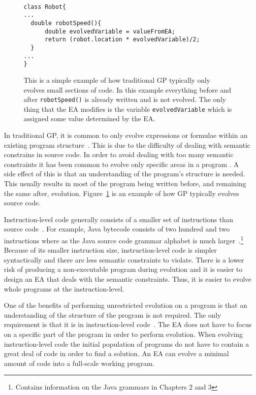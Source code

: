 \documentclass{sig-alternate}
\begin{document}
\begin{figure}
\centering
{\tt
\begin{verbatim}
class Robot{	
...
  double robotSpeed(){	
      double evolvedVariable = valueFromEA;
      return (robot.location * evolvedVariable)/2;
  }
...
}

\end{verbatim}
}
\caption{This is a simple example of how traditional GP typically only evolves small sections of code. In this example everything before and after \texttt{robotSpeed()} is already written and is not evolved. The only thing that the EA modifies is the variable \texttt{evolvedVariable} which is assigned some value determined by the EA.}
\label{traditional}
\end{figure}


In traditional GP, it is common to only evolve expressions or formulae within an existing program structure~\cite{FINCH:2011}. This is due to the difficulty of dealing with semantic constrains in source code. In order to avoid dealing with too many semantic constraints it has been common to evolve only specific areas in a program . A side effect of this is that an understanding of the program's structure is needed. This usually results in most of the program being written before, and remaining the same after, evolution. Figure~\ref{traditional} is an example of how GP typically evolves source code.\par

Instruction-level code generally consists of a smaller set of instructions than source code~\cite{Assembly:2010}. For example, Java bytecode consists of two hundred and two instructions where as the Java source code grammar alphabet is much larger~\cite{JVMspec:2013, Oracle:2013}.\footnote{\cite{Oracle:2013} Contains information on the Java grammars in Chapters 2 and 3} Because of its smaller instruction size, instruction-level code is simpler syntactically and there are less semantic constraints to violate. There is a lower risk of producing a non-executable program during evolution and it is easier to design an EA that deals with the semantic constraints. Thus, it is easier to evolve whole programs at the instruction-level.\par

One of the benefits of performing unrestricted evolution on a program is that an understanding of the structure of the program is not required. The only requirement is that it is in instruction-level code~\cite{FINCH2:2009, Assembly:2010}. The EA does not have to focus on a specific part of the program in order to perform evolution. When evolving instruction-level code the initial population of programs do not have to contain a great deal of code in order to find a solution. An EA can evolve a minimal amount of code into a full-scale working program.\par
\end{document}
